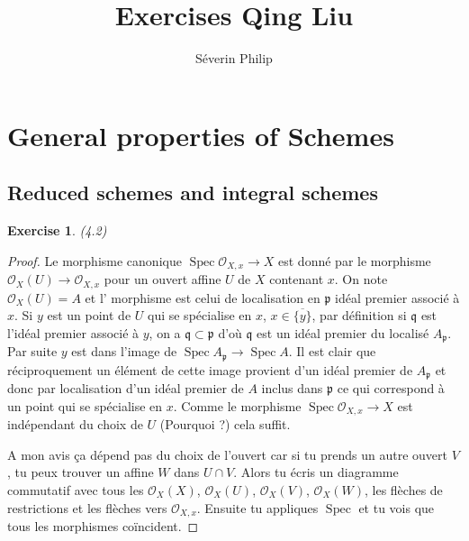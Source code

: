 \documentclass[A4, 11pt]{article}
\author{Séverin Philip}
\newtheorem{exer}{Exercise}
\def\Spec{ \operatorname{Spec}}
\begin{document}
\title{Exercises Qing Liu}
\maketitle

\section{General properties of Schemes}
\subsection{Reduced schemes and integral schemes}
\begin{exer} (4.2)
\end{exer}
\begin{proof}
Le morphisme canonique $\Spec \mathcal{O}_{X,x} \rightarrow X$ est donné par le morphisme 
$\mathcal{O}_{X}(U) \rightarrow \mathcal{O}_{X,x}$ pour un ouvert affine $U$ de $X$ contenant $x$. On note $\mathcal{O}_{X}(U)=A$ et l' morphisme est celui de localisation en $\mathfrak{p}$ idéal premier associé à $x$. Si $y$ est un point de $U$ qui se spécialise en $x$, $x\in \overline{\{y\}}$, par définition si $\mathfrak{q}$ est l'idéal premier associé à $y$, on a $\mathfrak{q} \subset \mathfrak{p}$ d'où $\mathfrak{q}$ est un idéal premier du localisé $A_{\mathfrak{p}}$. Par suite $y$ est dans l'image de $\Spec A_{\mathfrak{p}} \rightarrow \Spec A$. Il est clair que réciproquement un élément de cette image provient d'un idéal premier de $A_{\mathfrak{p}}$ et donc par localisation d'un idéal premier de $A$ inclus dans $\mathfrak{p}$ ce qui correspond à un point qui se spécialise en $x$. Comme le morphisme $\Spec \mathcal{O}_{X,x} \rightarrow X$ est indépendant du choix de $U$ (Pourquoi ?) cela suffit.

{\color{blue} A mon avis ça dépend pas du choix de l'ouvert car si tu prends un autre ouvert $V$, tu peux trouver un affine $W$ dans $U\cap V$. Alors tu écris un diagramme commutatif avec tous les $\mathcal{O}_X(X)$, $\mathcal{O}_X(U)$, $\mathcal{O}_X(V)$, $\mathcal{O}_X(W)$, les flèches de restrictions et les flèches vers $\mathcal{O}_{X,x}$. Ensuite tu appliques $\Spec$ et tu vois que tous les morphismes coïncident.}

\end{proof}
\end{document}
